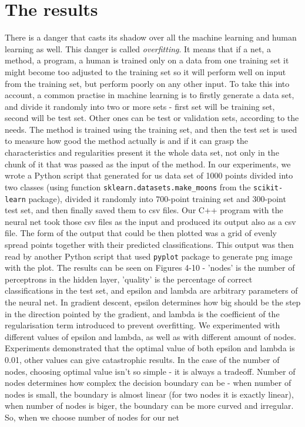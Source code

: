 \documentclass[3p,twocolumn]{elsarticle}
\begin{document}
\section{The results}

There is a danger that casts its shadow over all the machine learning and human learning as well. This danger is called \emph{overfitting}. It means that if a net, a method, a program, a human is trained only on a data from one training set it might become too adjusted to the training set so it will perform well on input from the training set, but perform poorly on any other input. To take this into account, a common practise in machine learning is to firstly generate a data set, and divide it randomly into two or more sets - first set will be training set, second will be test set. Other ones can be test or validation sets, according to the needs. The method is trained using the training set, and then the test set is used to measure how good the method actually is and if it can grasp the characteristics and regularities present it the whole data set, not only in the chunk of it that was passed as the input of the method. In our experiments, we wrote a Python script that generated for us data set of 1000 points divided into two classes (using function \texttt{sklearn.datasets.make\_moons} from the \texttt{scikit-learn} package), divided it randomly into 700-point training set and 300-point test set, and then finally saved them to csv files. Our C++ program with the neural net took those csv files as the input and produced its output also as a csv file. The form of the output that could be then plotted was a grid of evenly spread points together with their predicted classifications. This output was then read by another Python script that used \texttt{pyplot} package to generate png image with the plot. The results can be seen on Figures 4-10 - 'nodes' is the number of perceptrons in the hidden layer, 'quality' is the percentage of correct classifications in the test set, and epsilon and lambda are arbitrary parameters of the neural net. In gradient descent, epsilon determines how big should be the step in the direction pointed by the gradient, and lambda is the coefficient of the regularisation term introduced to prevent overfitting. We experimented with different values of epsilon and lambda, as well as with different amount of nodes. Experiments demonstrated that the optimal value of both epsilon and lambda is 0.01, other values can give catastrophic results. In the case of the number of nodes, choosing optimal value isn't so simple - it is always a tradeoff. Number of nodes determines how complex the decision boundary can be - when number of nodes is small, the boundary is almost linear (for two nodes it is exactly linear), when number of nodes is biger, the boundary can be more curved and irregular. So, when we choose number of nodes for our net 
\end{document}
